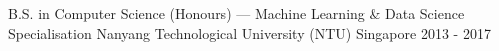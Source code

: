 

\begin{cventries}

  \cventry
    {B.S. in Computer Science (Honours) --- Machine Learning \& Data Science Specialisation} %
    {Nanyang Technological University (NTU)} %
    {Singapore} %
    {2013 - 2017} %
    {} %

\end{cventries}
